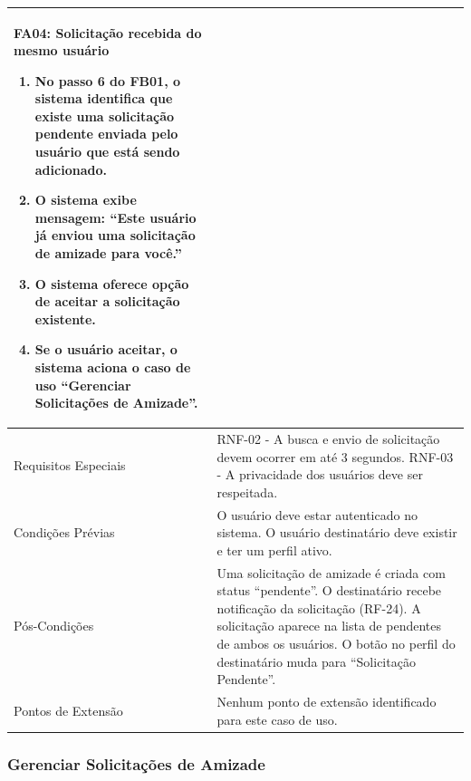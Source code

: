 \begin{longtable}{ >{\raggedright}p{2.8cm} | >{\raggedright\arraybackslash}p{10.7cm} }
\textbf{FA04:} Solicitação recebida do mesmo usuário
\vspace{2pt}
\begin{enumerate}[nosep,leftmargin=1.2em,topsep=0pt,partopsep=0pt,parsep=0pt,itemsep=0pt,after=\vspace{2pt}]
	\item No passo 6 do FB01, o sistema identifica que existe uma solicitação pendente enviada pelo usuário que está sendo adicionado.
	\item O sistema exibe mensagem: ``Este usuário já enviou uma solicitação de amizade para você.''
	\item O sistema oferece opção de aceitar a solicitação existente.
	\item Se o usuário aceitar, o sistema aciona o caso de uso ``Gerenciar Solicitações de Amizade''.
\end{enumerate}
\mbox{} \\ \hline

Requisitos Especiais & RNF-02 - A busca e envio de solicitação devem ocorrer em até 3 segundos. RNF-03 - A privacidade dos usuários deve ser respeitada. \\ \hline

Condições Prévias & O usuário deve estar autenticado no sistema. O usuário destinatário deve existir e ter um perfil ativo. \\ \hline

Pós-Condições & Uma solicitação de amizade é criada com status ``pendente''. O destinatário recebe notificação da solicitação (RF-24). A solicitação aparece na lista de pendentes de ambos os usuários. O botão no perfil do destinatário muda para ``Solicitação Pendente''. \\ \hline

Pontos de Extensão & Nenhum ponto de extensão identificado para este caso de uso. \\
\end{longtable}
\renewcommand{\arraystretch}{1}
\FloatBarrier


\subsubsection{Gerenciar Solicitações de Amizade}

